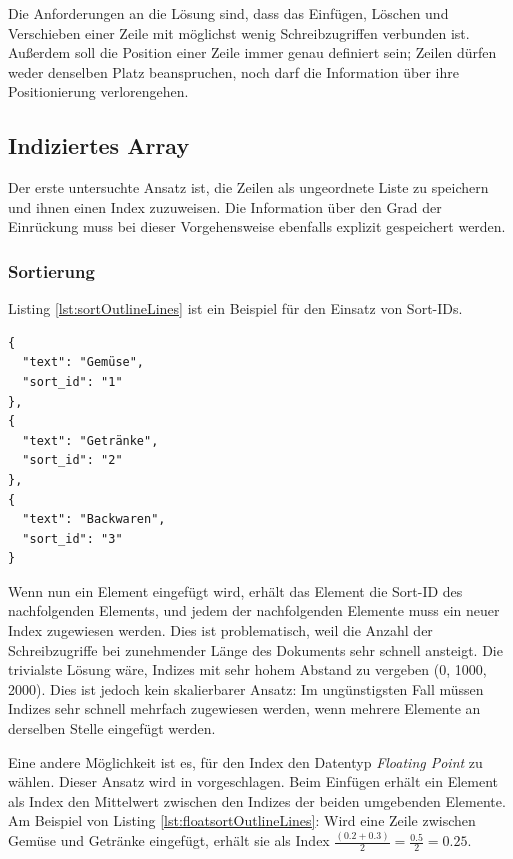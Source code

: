 Die Anforderungen an die Lösung sind, dass das Einfügen, Löschen und Verschieben einer Zeile mit möglichst wenig Schreibzugriffen verbunden ist. Außerdem soll die Position einer Zeile immer genau definiert sein; Zeilen dürfen weder denselben Platz beanspruchen, noch darf die Information über ihre Positionierung verlorengehen.


\subsection{Indiziertes Array}
\label{subsec:array}

Der erste untersuchte Ansatz ist, die Zeilen als ungeordnete Liste zu speichern und ihnen einen Index zuzuweisen. Die Information über den Grad der Einrückung muss bei dieser Vorgehensweise ebenfalls explizit gespeichert werden.

\subsubsection{Sortierung}

Listing \ref{lst:sortOutlineLines} ist ein Beispiel für den Einsatz von Sort-IDs.

\medskip
\begin{lstlisting}[caption=Drei Zeilen mit einfachem Index, label={lst:sortOutlineLines}]
{
  "text": "Gemüse",
  "sort_id": "1"
},
{
  "text": "Getränke",
  "sort_id": "2"
},
{
  "text": "Backwaren",
  "sort_id": "3"
}
\end{lstlisting}

Wenn nun ein Element eingefügt wird, erhält das Element die  {\selectfont Sort-ID} des nachfolgenden Elements, und jedem der nachfolgenden Elemente muss ein neuer Index zugewiesen werden. Dies ist problematisch, weil die Anzahl der Schreibzugriffe bei zunehmender Länge des Dokuments sehr schnell ansteigt. Die trivialste Lösung wäre, Indizes mit sehr hohem Abstand zu vergeben (0, 1000, 2000). Dies ist jedoch kein skalierbarer Ansatz: Im ungünstigsten Fall müssen Indizes sehr schnell mehrfach zugewiesen werden, wenn mehrere Elemente an derselben Stelle eingefügt werden. 

Eine andere Möglichkeit ist es, für den Index den Datentyp \textit{Floating Point} zu wählen. Dieser Ansatz wird in  vorgeschlagen. Beim Einfügen erhält ein Element als Index den Mittelwert zwischen den Indizes der beiden umgebenden Elemente. Am Beispiel von Listing \ref{lst:floatsortOutlineLines}: Wird eine Zeile zwischen {\selectfont Gemüse} und {\selectfont Getränke} eingefügt, erhält sie als Index $\frac{(0.2 + 0.3)}{2} = \frac{0.5}{2} = 0.25$.


